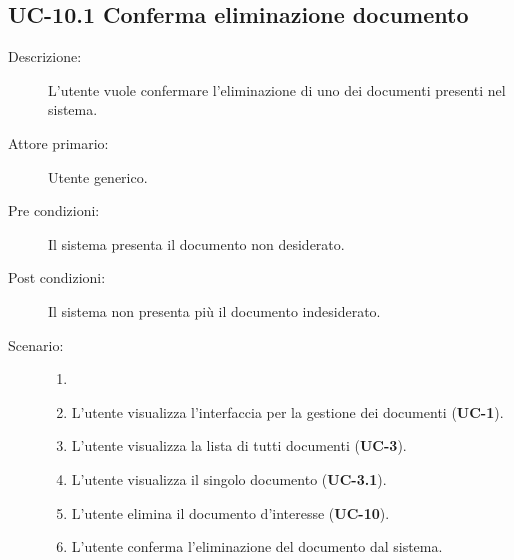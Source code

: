 \subsection{UC-10.1 Conferma eliminazione documento}
\begin{description}
    \item[Descrizione:] L'utente vuole confermare l'eliminazione di uno dei documenti presenti nel sistema.
    \item[Attore primario:] Utente generico.
    \item[Pre condizioni:] Il sistema presenta il documento non desiderato.
    \item[Post condizioni:] Il sistema non presenta più il documento indesiderato.
    \item[Scenario:] 
    \begin{enumerate}
        \item[] 
        \item L’utente visualizza l'interfaccia per la gestione dei documenti (\textbf{UC-1}).
        \item L’utente visualizza la lista di tutti documenti (\textbf{UC-3}).
        \item L'utente visualizza il singolo documento (\textbf{UC-3.1}).
        \item L'utente elimina il documento d'interesse (\textbf{UC-10}).
        \item L'utente conferma l'eliminazione del documento dal sistema.
    \end{enumerate}
    
\end{description}

